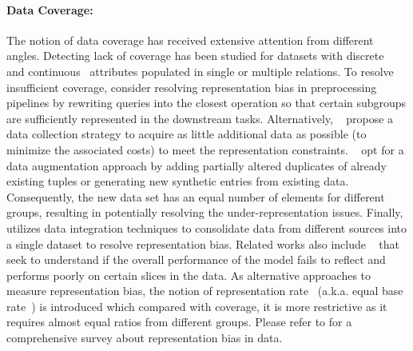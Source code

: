\documentclass[11pt]{article}
\begin{document}
\paragraph{Data Coverage:}The notion of data coverage has received extensive attention from different angles. Detecting lack of coverage has been studied for datasets with discrete~\cite{asudeh2019assessing} and continuous~\cite{asudeh2021coverage} attributes populated in single or multiple \cite{lin2020identifying} relations.
To resolve insufficient coverage, \cite{accinelli2020coverage, accinelli2021impact,shetiya2022fairness}
consider resolving representation bias in preprocessing pipelines by rewriting queries into the closest operation so that certain subgroups are sufficiently represented in the downstream tasks. Alternatively, ~\cite{asudeh2019assessing,tae2021slice} propose a data collection strategy to acquire as little additional data as possible (to minimize the associated costs) to meet the representation constraints. ~\cite{sharma2020data,iosifidis2018dealing,celis2020data} opt for a data augmentation approach by adding partially altered duplicates of already existing tuples or generating new synthetic entries from existing data. Consequently, the new data set has an equal number of elements for different groups, resulting in potentially resolving the under-representation issues. Finally,  \cite{nargesian2021tailoring} utilizes data integration techniques to consolidate data from different sources into a single dataset to resolve representation bias.
Related works also include ~\cite{chung2019slice,sagadeeva2021sliceline,tae2021slice} that seek to understand if the overall performance of the model fails to reflect and performs poorly on certain slices in the data.
As alternative approaches to measure representation bias, the notion of representation rate~\cite{celis2020data} (a.k.a. equal base rate~\cite{kleinberg2016inherent}) is introduced which compared with coverage, it is more restrictive as it requires almost equal ratios from different groups.
Please refer to \cite{shahbazi2023representation} for a comprehensive survey about representation bias in data. 
\end{document}
